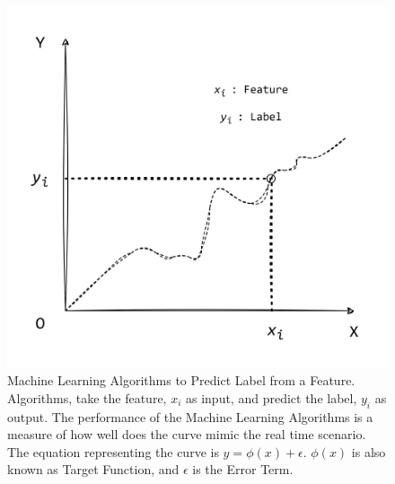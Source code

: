 \documentclass[sn-basic]{sn-jnl}%
\theoremstyle{thmstyleone}%
\theoremstyle{thmstyletwo}%
\theoremstyle{thmstylethree}%
\begin{document}
\begin{figure}[!h]
\centering
\includegraphics[width=\textwidth]{1}
\caption{Machine Learning Algorithms to Predict Label from a Feature. Algorithms, take the feature, $x_i$ as input, and predict the label, $y_i$ as output. The performance of the Machine Learning Algorithms is a measure of how well does the curve mimic the real time scenario. The equation representing the curve is $y = \phi(x) + \epsilon$. $\phi(x)$ is also known as Target Function, and $\epsilon$ is the Error Term.}
\label{Fig. 1}
\end{figure}
\end{document}
